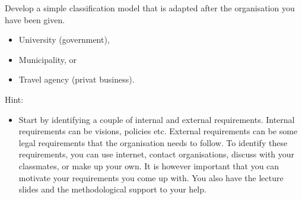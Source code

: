 \documentclass[a4paper]{llncs}
\begin{document}
Develop a simple classification model that is adapted after the organisation you
have been given.
\begin{itemize}
  \item University (government),
  \item Municipality, or
  \item Travel agency (privat business).
\end{itemize}
\begin{framed}\noindent
  Hint:
  \begin{itemize}
    \item Start by identifying a couple of internal and external requirements.
      Internal requirements can be visions, policies etc. External requirements
      can be some legal requirements that the organisation needs to follow.
      To identify these requirements, you can use internet, contact
      organisations, discuss with your classmates, or make up your own.
      It is however important that you can motivate your requirements you come
      up with. You also have the lecture slides and the methodological support
      to your help.

  \end{itemize}
\end{framed}
\end{document}

